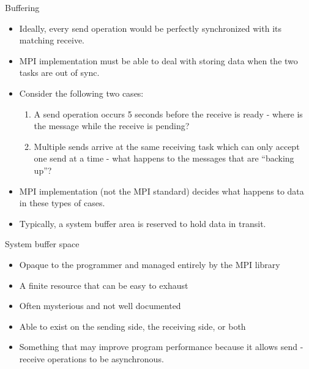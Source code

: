 \documentclass[9pt,c]{beamer}
\begin{document}
\begin{frame}[allowframebreaks]{Buffering}
  \begin{itemize}
    \item Ideally, every send operation would be perfectly synchronized with its matching receive.
    \item MPI implementation must be able to deal with storing data when the two tasks are out of sync.
    \item Consider the following two cases:
      \begin{enumerate}
        \item A send operation occurs 5 seconds before the receive is ready - where is the message while the receive is pending?
        \item Multiple sends arrive at the same receiving task which can only accept one send at a time - what happens to the messages that are “backing up”?
      \end{enumerate}
    \item MPI implementation (not the MPI standard) decides what happens to data in these types of cases. 
    \item Typically, a system buffer area is reserved to hold data in transit.
  \end{itemize}
  \begin{block}{System buffer space}
    \begin{itemize}
      \item Opaque to the programmer and managed entirely by the MPI library
      \item A finite resource that can be easy to exhaust
      \item Often mysterious and not well documented
      \item Able to exist on the sending side, the receiving side, or both
      \item Something that may improve program performance because it allows send - receive operations to be asynchronous.
    \end{itemize}
  \end{block}
\end{frame}
\end{document}
